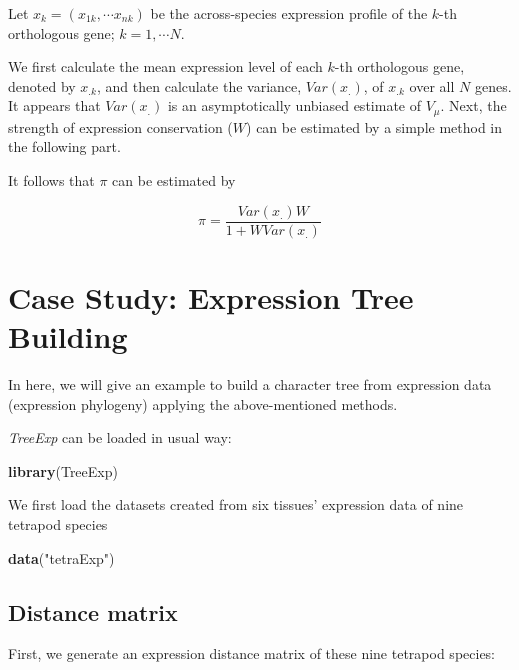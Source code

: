\documentclass[]{book}
\newenvironment{Shaded}{\begin{snugshade}}{\end{snugshade}}
\newcommand{\KeywordTok}[1]{\textcolor[rgb]{0.13,0.29,0.53}{\textbf{#1}}}
\newcommand{\NormalTok}[1]{#1}
\newcommand{\StringTok}[1]{\textcolor[rgb]{0.31,0.60,0.02}{#1}}
\begin{document}
Let \(x_k=\left(x_{1k},\cdots x_{nk}\right)\) be the across-species expression profile of the \(k\)-th orthologous gene; \(k=1,\cdots N\).

We first calculate the mean expression level of each \(k\)-th orthologous gene, denoted by \(x_{.k}\), and then calculate the variance, \(Var\left(x_.\right)\), of \(x_{.k}\) over all \(N\) genes. It appears that \(Var\left(x_.\right)\) is an asymptotically unbiased estimate of \(V_\mu\). Next, the strength of expression conservation (\(W\)) can be estimated by a simple method in the following part.

It follows that \(\pi\) can be estimated by

\[\pi=\frac{Var\left(x_{.}\right)W}{1+WVar(x_.)}\tag{1.11}\]
\newpage

\hypertarget{case-study-expression-tree-building}{%
\section{Case Study: Expression Tree Building}\label{case-study-expression-tree-building}}

In here, we will give an example to build a character tree from expression data (expression phylogeny) applying the above-mentioned methods.

\emph{TreeExp} can be loaded in usual way:

\begin{Shaded}
\begin{Highlighting}[]
\KeywordTok{library}\NormalTok{(TreeExp)}
\end{Highlighting}
\end{Shaded}

We first load the datasets created from six tissues' expression data of nine tetrapod species

\begin{Shaded}
\begin{Highlighting}[]
\KeywordTok{data}\NormalTok{(}\StringTok{"tetraExp"}\NormalTok{)}
\end{Highlighting}
\end{Shaded}

\hypertarget{distance-matrix}{%
\subsection{Distance matrix}\label{distance-matrix}}

First, we generate an expression distance matrix of these nine tetrapod species:
\end{document}
